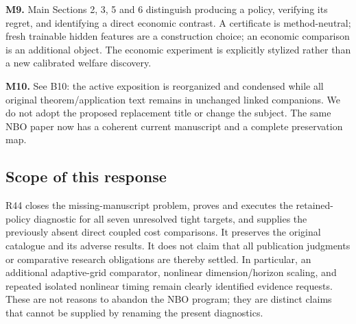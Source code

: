 \documentclass[ecta,nameyear,draft]{econsocart}
\begin{document}
\textbf{M9.} Main Sections 2, 3, 5 and 6 distinguish producing a policy,
verifying its regret, and identifying a direct economic contrast. A
certificate is method-neutral; fresh trainable hidden features are a
construction choice; an economic comparison is an additional object. The
economic experiment is explicitly stylized rather than a new calibrated
welfare discovery.

\textbf{M10.} See B10: the active exposition is reorganized and
condensed while all original theorem/application text remains in
unchanged linked companions. We do not adopt the proposed replacement
title or change the subject. The same NBO paper now has a coherent
current manuscript and a complete preservation map.

\hypertarget{scope-of-this-response}{%
\subsection{Scope of this response}\label{scope-of-this-response}}

R44 closes the missing-manuscript problem, proves and executes the
retained-policy diagnostic for all seven unresolved tight targets, and
supplies the previously absent direct coupled cost comparisons. It
preserves the original catalogue and its adverse results. It does not
claim that all publication judgments or comparative research obligations
are thereby settled. In particular, an additional adaptive-grid
comparator, nonlinear dimension/horizon scaling, and repeated isolated
nonlinear timing remain clearly identified evidence requests. These are
not reasons to abandon the NBO program; they are distinct claims that
cannot be supplied by renaming the present diagnostics.
\end{document}
